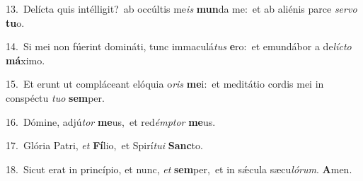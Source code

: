 {\numbfont\textcolor{\numbcolor}{13.}}~Delícta quis intélligit?~\dagger ab occúltis me\textit{is} \textbf{mun}\-da me:~\star et ab aliénis parce \textit{ser}\-\textit{vo} \textbf{tu}\-o.\par
{\numbfont\textcolor{\numbcolor}{14.}}~Si mei non fúerint domináti, tunc immaculá\textit{tus} \textbf{e}\-ro:~\star et emundábor a de\-\textit{líc}\-\textit{to} \textbf{má}\-ximo.\par
{\numbfont\textcolor{\numbcolor}{15.}}~Et erunt ut compláceant elóquia o\textit{ris} \textbf{me}\-i:~\star et meditátio cordis mei in conspéctu \textit{tu}\-\textit{o} \textbf{sem}\-per.\par
{\numbfont\textcolor{\numbcolor}{16.}}~Dómine, adjú\textit{tor} \textbf{me}\-us,~\star et red\-\textit{émp}\-\textit{tor} \textbf{me}\-us.\par
{\numbfont\textcolor{\numbcolor}{17.}}~Glória Patri, \textit{et} \textbf{Fí}\-lio,~\star et Spirí\-\textit{tu}\-\textit{i} \textbf{Sanc}\-to.\par
{\numbfont\textcolor{\numbcolor}{18.}}~Sicut erat in princípio, et nunc, \textit{et} \textbf{sem}\-per,~\star et in sǽcula sæcu\-\textit{ló}\-\textit{rum}. \textbf{A}\-men.\par
